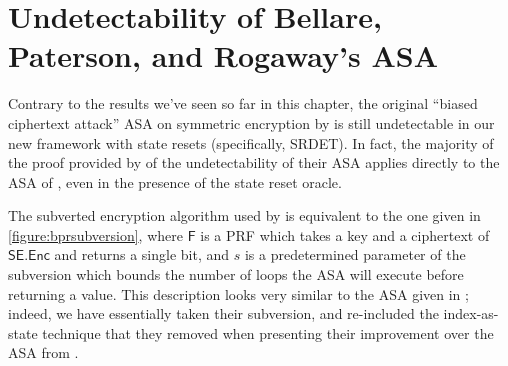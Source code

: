 \section{Undetectability of Bellare, Paterson, and Rogaway's ASA} \label{sec:bpranalysis}

Contrary to the results we've seen so far in this chapter, the original ``biased ciphertext attack'' ASA on symmetric encryption by \cite{C:BelPatRog14} is still undetectable in our new framework with state resets (specifically, SRDET). In fact, the majority of the proof provided by \cite{CCS:BelJaeKan15} of the undetectability of their ASA applies directly to the ASA of \cite{C:BelPatRog14}, even in the presence of the state reset oracle.

The subverted encryption algorithm used by \cite{C:BelPatRog14} is equivalent to the one given in \autoref{figure:bprsubversion}, where $\mathsf{F}$ is a PRF which takes a key and a ciphertext of $\mathsf{SE.Enc}$ and returns a single bit, and $s$ is a predetermined parameter of the subversion which bounds the number of loops the ASA will execute before returning a value. This description looks very similar to the ASA given in \cite{CCS:BelJaeKan15}; indeed, we have essentially taken their subversion, and re-included the index-as-state technique that they removed when presenting their improvement over the ASA from \cite{C:BelPatRog14}.

